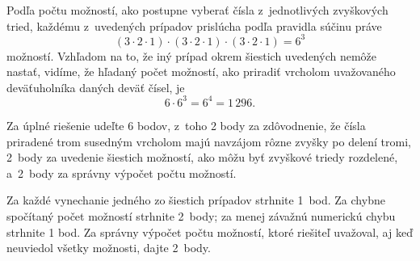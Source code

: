 {Podľa počtu možností, ako postupne vyberať čísla z~jednotlivých zvyškových tried,
každému z~uvedených prípadov prislúcha podľa pravidla súčinu práve
$$
(3\cdot 2\cdot 1)\cdot(3\cdot 2\cdot 1)\cdot(3\cdot 2\cdot 1)=6^3
$$
možností.
Vzhľadom na to, že iný prípad okrem šiestich uvedených nemôže nastať, vidíme, že
hľadaný počet možností, ako priradiť vrcholom uvažovaného deväťuholníka
daných deväť čísel, je
$$
6 \cdot 6^3=6^4=1\,296.
$$

\nobreak\medskip\petit\noindent
Za úplné riešenie udeľte 6 bodov, z~toho 2 body za zdôvodnenie, že čísla
priradené trom susedným vrcholom majú navzájom rôzne zvyšky po delení tromi, 2~body za uvedenie šiestich možností, ako môžu byť zvyškové triedy rozdelené, a~2~body za správny výpočet počtu možností.

Za každé vynechanie jedného zo šiestich prípadov strhnite 1~bod. Za chybne
spočítaný počet možností strhnite 2~body; za menej závažnú numerickú chybu
strhnite 1 bod. Za správny výpočet počtu možností, ktoré riešiteľ uvažoval,
aj keď neuviedol všetky možnosti, dajte 2~body.
\endpetit
\bigbreak
}

